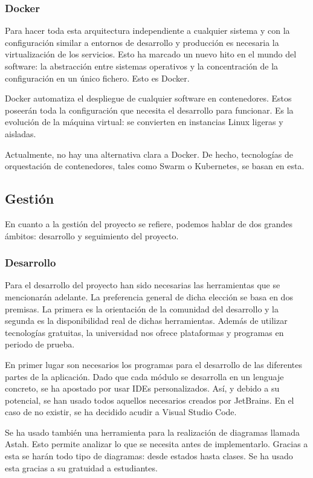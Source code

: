 \subsubsection{Docker}

Para hacer toda esta arquitectura independiente a cualquier sistema y con la configuración similar a entornos de desarrollo y producción es necesaria la virtualización de los servicios. Esto ha marcado un nuevo hito en el mundo del software: la abstracción entre sistemas operativos y la concentración de la configuración en un único fichero. Esto es Docker.

Docker automatiza el despliegue de cualquier software en contenedores. Estos poseerán toda la configuración que necesita el desarrollo para funcionar. Es la evolución de la máquina virtual: se convierten en instancias Linux ligeras y aisladas.

Actualmente, no hay una alternativa clara a Docker. De hecho, tecnologías de orquestación de contenedores, tales como Swarm o Kubernetes, se basan en esta.

\subsection{Gestión}

En cuanto a la gestión del proyecto se refiere, podemos hablar de dos grandes ámbitos: desarrollo y seguimiento del proyecto.

\subsubsection{Desarrollo}

Para el desarrollo del proyecto han sido necesarias las herramientas que se mencionarán adelante. La preferencia general de dicha elección se basa en dos premisas. La primera es la orientación de la comunidad del desarrollo y la segunda es la disponibilidad real de dichas herramientas. Además de utilizar tecnologías gratuitas, la universidad nos ofrece plataformas y programas en periodo de prueba.

En primer lugar son necesarios los programas para el desarrollo de las diferentes partes de la aplicación. Dado que cada módulo se desarrolla en un lenguaje concreto, se ha apostado por usar IDEs personalizados. Así, y debido a su potencial, se han usado todos aquellos necesarios creados por JetBrains. En el caso de no existir, se ha decidido acudir a Visual Studio Code.

Se ha usado también una herramienta para la realización de diagramas llamada Astah. Esto permite analizar lo que se necesita antes de implementarlo. Gracias a esta se harán todo tipo de diagramas: desde estados hasta clases. Se ha usado esta gracias a su gratuidad a estudiantes.


